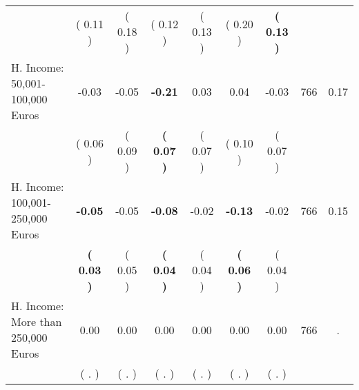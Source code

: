 \begin{tabular}{lcccccccc}
 & (     0.11 ) & (     0.18 ) & (     0.12 ) & (     0.13 ) & (     0.20 ) & \textbf{(     0.13 )} & \\
H. Income: 50,001-100,000 Euros &     -0.03 &     -0.05 & \textbf{    -0.21} &      0.03 &      0.04 &     -0.03 & 766 &       0.17 \\ 
 & (     0.06 ) & (     0.09 ) & \textbf{(     0.07 )} & (     0.07 ) & (     0.10 ) & (     0.07 ) & \\
H. Income: 100,001-250,000 Euros & \textbf{    -0.05} &     -0.05 & \textbf{    -0.08} &     -0.02 & \textbf{    -0.13} &     -0.02 & 766 &       0.15 \\ 
 & \textbf{(     0.03 )} & (     0.05 ) & \textbf{(     0.04 )} & (     0.04 ) & \textbf{(     0.06 )} & (     0.04 ) & \\
H. Income: More than 250,000 Euros &      0.00 &      0.00 &      0.00 &      0.00 &      0.00 &      0.00 & 766 &          . \\ 
 & (        . ) & (        . ) & (        . ) & (        . ) & (        . ) & (        . ) & \\
\bottomrule
\end{tabular}
